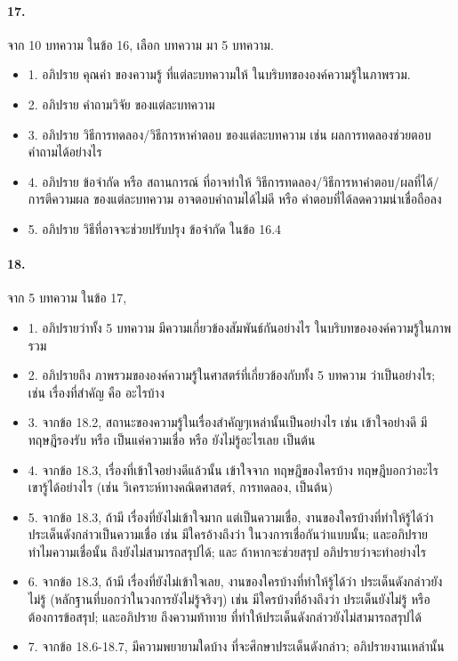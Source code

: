 \paragraph{17.} 
จาก 10 บทความ ในข้อ 16, เลือก บทความ มา 5 บทความ.
\begin{itemize}
\item 1. อภิปราย คุณค่า ของความรู้ ที่แต่ละบทความให้ ในบริบทขององค์ความรู้ในภาพรวม.
\item 2. อภิปราย คำถามวิจัย ของแต่ละบทความ
\item 3. อภิปราย วิธีการทดลอง/วิธีการหาคำตอบ ของแต่ละบทความ เช่น ผลการทดลองช่วยตอบคำถามได้อย่างไร
\item 4. อภิปราย ข้อจำกัด หรือ สถานการณ์ ที่อาจทำให้ วิธีการทดลอง/วิธีการหาคำตอบ/ผลที่ได้/การตีความผล ของแต่ละบทความ อาจตอบคำถามได้ไม่ดี หรือ คำตอบที่ได้ลดความน่าเชื่อถือลง
\item 5. อภิปราย วิธีที่อาจจะช่วยปรับปรุง ข้อจำกัด ในข้อ 16.4
\end{itemize}

\paragraph{18.} 
จาก 5 บทความ ในข้อ 17, 
\begin{itemize}
\item 1. อภิปรายว่าทั้ง 5 บทความ มีความเกี่ยวข้องสัมพันธ์กันอย่างไร ในบริบทขององค์ความรู้ในภาพรวม
\item 2. อภิปรายถึง ภาพรวมขององค์ความรู้ในศาสตร์ที่เกี่ยวข้องกับทั้ง 5 บทความ ว่าเป็นอย่างไร;
เช่น เรื่องที่สำคัญ คือ อะไรบ้าง
\item 3. จากข้อ 18.2, สถานะของความรู้ในเรื่องสำคัญๆเหล่านั้นเป็นอย่างไร เช่น เข้าใจอย่างดี มีทฤษฎีรองรับ หรือ เป็นแค่ความเชื่อ หรือ ยังไม่รู้อะไรเลย เป็นต้น
\item 4. จากข้อ 18.3, เรื่องที่เข้าใจอย่างดีแล้วนั้น เข้าใจจาก ทฤษฎีของใครบ้าง ทฤษฎีบอกว่าอะไร เขารู้ได้อย่างไร (เช่น วิเคราะห์ทางคณิตศาสตร์, การทดลอง, เป็นต้น)
\item 5. จากข้อ 18.3, ถ้ามี เรื่องที่ยังไม่เข้าใจมาก แต่เป็นความเชื่อ, งานของใครบ้างที่ทำให้รู้ได้ว่า ประเด็นดังกล่าวเป็นความเชื่อ เช่น มีใครอ้างถึงว่า ในวงการเชื่อกันว่าแบบนั้น;
และอภิปราย ทำไมความเชื่อนั้น ถึงยังไม่สามารถสรุปได้;
และ ถ้าหากจะช่วยสรุป อภิปรายว่าจะทำอย่างไร
\item 6. จากข้อ 18.3, ถ้ามี เรื่องที่ยังไม่เข้าใจเลย, งานของใครบ้างที่ทำให้รู้ได้ว่า ประเด็นดังกล่าวยังไม่รู้ (หลักฐานที่บอกว่าในวงการยังไม่รู้จริงๆ) เช่น มีใครบ้างที่อ้างถึงว่า ประเด็นยังไม่รู้ หรือ ต้องการข้อสรุป;
และอภิปราย ถึงความท้าทาย ที่ทำให้ประเด็นดังกล่าวยังไม่สามารถสรุปได้
\item 7. จากข้อ 18.6-18.7, มีความพยายามใดบ้าง ที่จะศึกษาประเด็นดังกล่าว;
อภิปรายงานเหล่านั้น
\end{itemize}

